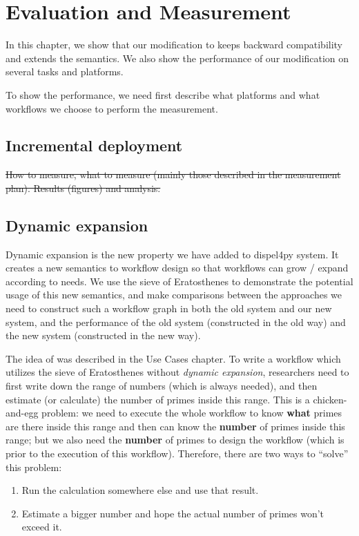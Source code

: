 \chapter{Evaluation and Measurement}
In this chapter, we show that our modification to \dpy keeps backward compatibility and extends the semantics. We also show the performance of our modification on several tasks and platforms.

To show the performance, we need first describe what platforms and what workflows we choose to perform the measurement.

\section{Incremental deployment}
\sout{How to measure, what to measure  (mainly those described in the measurement plan).
Results (figures) and analysis.}

\section{Dynamic expansion}
Dynamic expansion is the new property we have added to dispel4py system. It creates a new semantics to workflow design so that workflows can grow / expand according to needs. We use the sieve of Eratosthenes to demonstrate the potential usage of this new semantics, and make comparisons between the approaches we need to construct such a workflow graph in both the old system and our new system, and the performance of the old system (constructed in the old way) and the new system (constructed in the new way).

The idea of \tsieve was described in the Use Cases chapter. To write a workflow which utilizes the sieve of Eratosthenes without \emph{dynamic expansion},  researchers need to first write down the range of numbers (which is always needed), and then estimate (or calculate) the number of primes inside this range. This is a chicken-and-egg problem: we need to execute the whole workflow to know \textbf{what} primes are there inside this range and then can know the \textbf{number} of primes inside this range; but we also need the \textbf{number} of primes to design the workflow (which is prior to the execution of this workflow). Therefore, there are two ways to ``solve'' this problem:
\begin{enumerate}
	\item Run the calculation somewhere else and use that result.
	\item Estimate a bigger number and hope the actual number of primes won't exceed it.
\end{enumerate}

